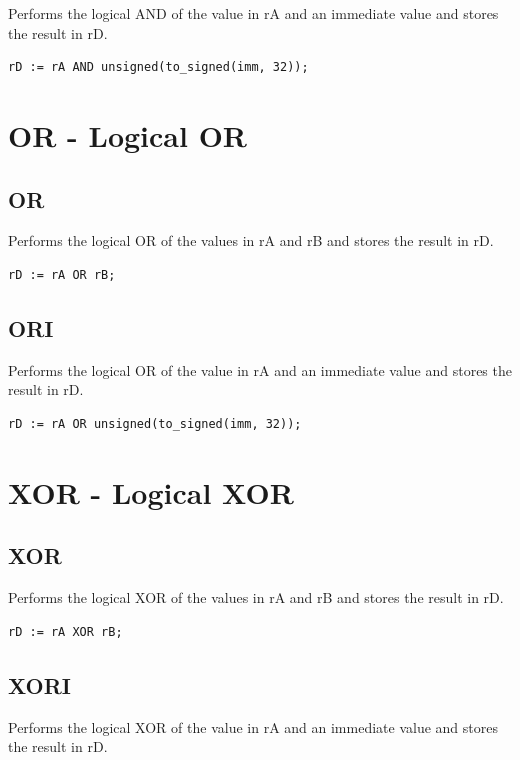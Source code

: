 \documentclass{UoYCSproject}
\begin{document}
Performs the logical AND of the value in rA and an immediate value and stores the result in rD.

\begin{lstlisting}
rD := rA AND unsigned(to_signed(imm, 32));
\end{lstlisting}

\section{OR - Logical OR}

\subsection{OR}

Performs the logical OR of the values in rA and rB and stores the result in rD.

\begin{lstlisting}
rD := rA OR rB;
\end{lstlisting}

\subsection{ORI}

Performs the logical OR of the value in rA and an immediate value and stores the result in rD.

\begin{lstlisting}
rD := rA OR unsigned(to_signed(imm, 32));
\end{lstlisting}

\section{XOR - Logical XOR}

\subsection{XOR}

Performs the logical XOR of the values in rA and rB and stores the result in rD.

\begin{lstlisting}
rD := rA XOR rB;
\end{lstlisting}

\subsection{XORI}

Performs the logical XOR of the value in rA and an immediate value and stores the result in rD.
\end{document}
